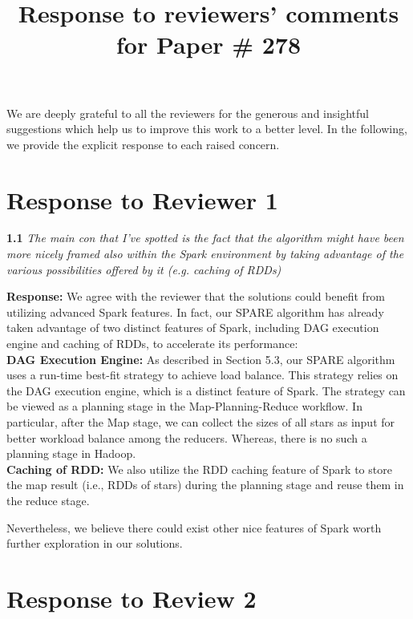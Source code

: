 \documentclass{vldb}
\begin{document}
\title{Response to reviewers' comments for Paper \# 278}
\maketitle

We are deeply grateful to all the reviewers for the generous and insightful
suggestions which help us to improve this work to a better level.
In the following, we provide the explicit response to each raised concern.

\section{Response to Reviewer 1}

\textbf{1.1} \emph{The main con that I've spotted is the fact that the algorithm might have been
more nicely framed also within the Spark environment by taking advantage of
the various possibilities offered by it (e.g. caching of RDDs)}

\textbf{Response:} We agree with the reviewer that the solutions could benefit from utilizing advanced Spark features. In fact, our SPARE algorithm has already taken advantage of two distinct features of Spark, including  DAG execution engine and caching of RDDs, to accelerate its performance:\\
\noindent\textbf{DAG Execution Engine:} As described in Section 5.3, our SPARE algorithm uses a run-time best-fit strategy to achieve load balance. This strategy relies on the DAG execution engine, which is a distinct feature of Spark. The strategy can be viewed as a planning stage in the Map-Planning-Reduce workflow. In particular, after the Map stage, we can collect the sizes of all stars as input for better workload balance among the reducers. Whereas, there is no such a planning stage in Hadoop. \\
\noindent\textbf{Caching of RDD: } We also utilize the RDD caching feature of Spark to store the map result (i.e., RDDs of stars)
during the planning stage and reuse them in the reduce stage.

Nevertheless, we believe there could exist other nice features of Spark worth further exploration in our solutions.






\section{Response to Review 2}
\end{document}
